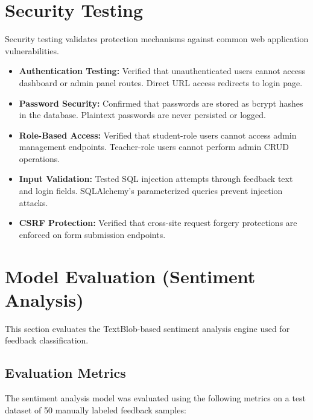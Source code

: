 \section{Security Testing}

Security testing validates protection mechanisms against common web application vulnerabilities.

\begin{itemize}
    \item \textbf{Authentication Testing:} Verified that unauthenticated users cannot access dashboard or admin panel routes. Direct URL access redirects to login page.
    \item \textbf{Password Security:} Confirmed that passwords are stored as bcrypt hashes in the database. Plaintext passwords are never persisted or logged.
    \item \textbf{Role-Based Access:} Verified that student-role users cannot access admin management endpoints. Teacher-role users cannot perform admin CRUD operations.
    \item \textbf{Input Validation:} Tested SQL injection attempts through feedback text and login fields. SQLAlchemy's parameterized queries prevent injection attacks.
    \item \textbf{CSRF Protection:} Verified that cross-site request forgery protections are enforced on form submission endpoints.
\end{itemize}


\section{Model Evaluation (Sentiment Analysis)}

This section evaluates the TextBlob-based sentiment analysis engine used for feedback classification.

\subsection{Evaluation Metrics}

The sentiment analysis model was evaluated using the following metrics on a test dataset of 50 manually labeled feedback samples:

